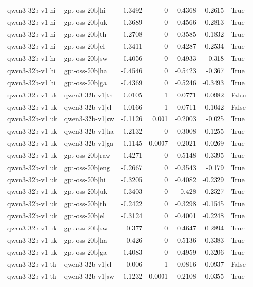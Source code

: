 \begin{table}
\begin{tabular}{l l r r r r l}
qwen3-32b-v1|hi & gpt-oss-20b|hi & -0.3492 & 0 & -0.4368 & -0.2615 & True \\
qwen3-32b-v1|hi & gpt-oss-20b|uk & -0.3689 & 0 & -0.4566 & -0.2813 & True \\
qwen3-32b-v1|hi & gpt-oss-20b|th & -0.2708 & 0 & -0.3585 & -0.1832 & True \\
qwen3-32b-v1|hi & gpt-oss-20b|el & -0.3411 & 0 & -0.4287 & -0.2534 & True \\
qwen3-32b-v1|hi & gpt-oss-20b|sw & -0.4056 & 0 & -0.4933 & -0.318 & True \\
qwen3-32b-v1|hi & gpt-oss-20b|ha & -0.4546 & 0 & -0.5423 & -0.367 & True \\
qwen3-32b-v1|hi & gpt-oss-20b|ga & -0.4369 & 0 & -0.5246 & -0.3493 & True \\
qwen3-32b-v1|uk & qwen3-32b-v1|th & 0.0105 & 1 & -0.0771 & 0.0982 & False \\
qwen3-32b-v1|uk & qwen3-32b-v1|el & 0.0166 & 1 & -0.0711 & 0.1042 & False \\
qwen3-32b-v1|uk & qwen3-32b-v1|sw & -0.1126 & 0.001 & -0.2003 & -0.025 & True \\
qwen3-32b-v1|uk & qwen3-32b-v1|ha & -0.2132 & 0 & -0.3008 & -0.1255 & True \\
qwen3-32b-v1|uk & qwen3-32b-v1|ga & -0.1145 & 0.0007 & -0.2021 & -0.0269 & True \\
qwen3-32b-v1|uk & gpt-oss-20b|raw & -0.4271 & 0 & -0.5148 & -0.3395 & True \\
qwen3-32b-v1|uk & gpt-oss-20b|eng & -0.2667 & 0 & -0.3543 & -0.179 & True \\
qwen3-32b-v1|uk & gpt-oss-20b|hi & -0.3205 & 0 & -0.4082 & -0.2329 & True \\
qwen3-32b-v1|uk & gpt-oss-20b|uk & -0.3403 & 0 & -0.428 & -0.2527 & True \\
qwen3-32b-v1|uk & gpt-oss-20b|th & -0.2422 & 0 & -0.3298 & -0.1545 & True \\
qwen3-32b-v1|uk & gpt-oss-20b|el & -0.3124 & 0 & -0.4001 & -0.2248 & True \\
qwen3-32b-v1|uk & gpt-oss-20b|sw & -0.377 & 0 & -0.4647 & -0.2894 & True \\
qwen3-32b-v1|uk & gpt-oss-20b|ha & -0.426 & 0 & -0.5136 & -0.3383 & True \\
qwen3-32b-v1|uk & gpt-oss-20b|ga & -0.4083 & 0 & -0.4959 & -0.3206 & True \\
qwen3-32b-v1|th & qwen3-32b-v1|el & 0.006 & 1 & -0.0816 & 0.0937 & False \\
qwen3-32b-v1|th & qwen3-32b-v1|sw & -0.1232 & 0.0001 & -0.2108 & -0.0355 & True \\

\end{tabular}
\end{table}
